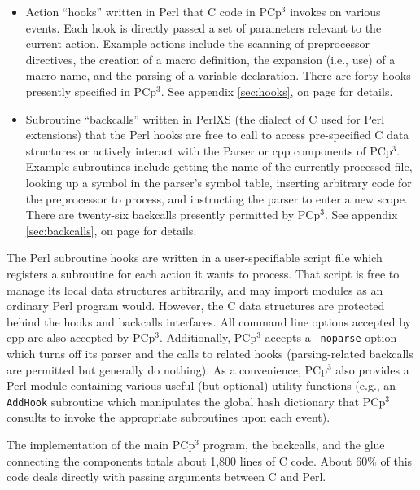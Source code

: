 \documentclass{article}
\newcommand{\pcp}{\mbox{\textsf{PCp}$^3$}}
\newcommand{\Cpp}{\mbox{\textsf{cpp}}}
\newcommand{\Perl}{\mbox{\textsf{Perl}}}
\newcommand{\C}{\mbox{\textsf{C}}}
\newcommand{\appendixref}[1]{appendix \ref{#1}, on page \pageref{#1}}
\newcommand{\ie}{i.e.,}
\newcommand{\eg}{e.g.,}
\begin{document}
\begin{itemize}
\item Action ``hooks'' written in \Perl{} that \C{} code in \pcp{}
      invokes on various events. Each hook is directly passed a set of
      parameters relevant to the current action.  Example actions
      include the scanning of preprocessor directives, the creation of a
      macro definition, the expansion (\ie{} use) of a macro name, and
      the parsing of a variable declaration.  There are forty hooks
      presently specified in \pcp{}. See \appendixref{sec:hooks} for
      details.
\item Subroutine ``backcalls'' written in {PerlXS} (the dialect of \C{}
      used for \Perl{} extensions) that the \Perl{} hooks are free to
      call to access pre-specified \C{} data structures or actively
      interact with the Parser or \Cpp{} components of \pcp{}.  Example
      subroutines include getting the name of the currently-processed
      file, looking up a symbol in the parser's symbol table, inserting
      arbitrary code for the preprocessor to process, and instructing the
      parser to enter a new scope.  There are twenty-six backcalls
      presently permitted by \pcp{}.  See \appendixref{sec:backcalls}
      for details.
\end{itemize}

\noindent The \Perl{} subroutine hooks are written in a user-specifiable script
file which registers a subroutine for each action it wants to process.
That script is free to manage its local data structures arbitrarily, and
may import modules as an ordinary \Perl{} program would.  However, the
\C{} data structures are protected behind the hooks and backcalls
interfaces. All command line options accepted by \Cpp{} are also
accepted by \pcp{}.  Additionally, \pcp{} accepts a \texttt{--noparse}
option which turns off its parser and the calls to related hooks
(parsing-related backcalls are permitted but generally do nothing).  As
a convenience, \pcp{} also provides a \Perl{} module containing various
useful (but optional) utility functions (\eg{} an \texttt{AddHook}
subroutine which manipulates the global hash dictionary
that \pcp{} consults to invoke the appropriate subroutines upon each
event).

The implementation of the main \pcp{} program, the backcalls, and the
glue connecting the components totals about 1,800 lines of \C{}
code.  About 60\% of this code deals directly with passing arguments
between \C{} and \Perl{}.
\end{document}
